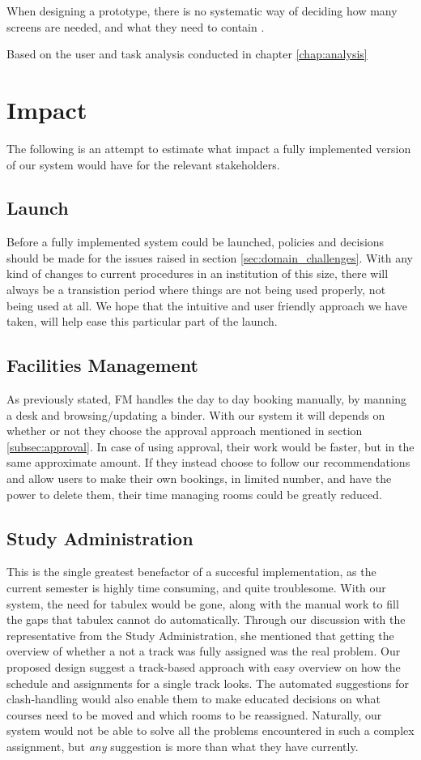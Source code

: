 When designing a prototype, there is no systematic way of deciding how many screens are needed, and what they need to contain \cite{lauesen}.


Based on the user and task analysis conducted in chapter \ref{chap:analysis}



\section{Impact}
\label{sec:impact}
The following is an attempt to estimate what impact a fully implemented version of our system would have for the relevant stakeholders.

\subsection{Launch}
Before a fully implemented system could be launched, policies and decisions should be made for the issues raised in section \ref{sec:domain_challenges}.
With any kind of changes to current procedures in an institution of this size, there will always be a transistion period where things are not being used properly, not being used at all. We hope that the intuitive and user friendly approach we have taken, will help ease this particular part of the launch.

\subsection{Facilities Management}
As previously stated, FM handles the day to day booking manually, by manning a desk and browsing/updating a binder.
With our system it will depends on whether or not they choose the approval approach mentioned in section \ref{subsec:approval}.
In case of using approval, their work would be faster, but in the same approximate amount.
If they instead choose to follow our recommendations and allow users to make their own bookings, in limited number, and have the power to delete them, their time managing rooms could be greatly reduced.

\subsection{Study Administration}
This is the single greatest benefactor of a succesful implementation, as the current semester is highly time consuming, and quite troublesome. With our system, the need for tabulex would be gone, along with the manual work to fill the gaps that tabulex cannot do automatically. Through our discussion with the representative from the Study Administration, she mentioned that getting the overview of whether a not a track was fully assigned was the real problem. Our proposed design suggest a track-based approach with easy overview on how the schedule and assignments for a single track looks. The automated suggestions for clash-handling would also enable them to make educated decisions on what courses need to be moved and which rooms to be reassigned. Naturally, our system would not be able to solve all the problems encountered in such a complex assignment, but \emph{any} suggestion is more than what they have currently.

